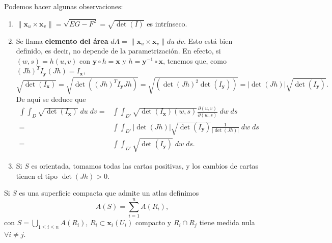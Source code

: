 \begin{observation} Podemos hacer algunas observaciones:
\begin{enumerate}
\item $\displaystyle \| \textbf{x} _{u} \times \textbf{x} _{v}\| = \sqrt{EG-F^{2}}=\sqrt{\det\left(I\right)} $ es intrínseco. 
\item Se llama \textbf{elemento del área} $\displaystyle dA = \| \textbf{x} _{u} \times \textbf{x} _{v}\| du\; dv $. Esto está bien definido, es decir, no depende de la parametrización. En efecto, si $\displaystyle \left(w,s\right)=h\left(u,v\right) $ con $\displaystyle \textbf{y} \circ h = \textbf{x}  $ y $\displaystyle h = \textbf{y} ^{-1} \circ \textbf{x}  $, tenemos que, como $\displaystyle \left(Jh\right)^{T}I _{ \textbf{y} }\left(Jh\right)= I _{ \textbf{x} } $, 
\[
	\sqrt{\det\left(I_{ \textbf{x} }\right)} =  \sqrt{\det\left(\left(Jh\right)^{T}I_{ \textbf{y} }Jh\right)} = \sqrt{\left(\det\left(Jh\right)^{2}\det\left(I_{ \textbf{y} }\right)\right)} = \left|\det\left(Jh\right)\right|\sqrt{\det\left(I_{ \textbf{y} }\right)} .
\]
De aquí se deduce que 
\[
\begin{split}
	\int \int _{D}\sqrt{\det\left(I_{ \textbf{x} }\right)} \; du \; dv = & \int \int _{D'}\sqrt{\det\left(I _{ \textbf{x} }\right)\left(w,s\right)}\frac{\partial \left(u,v\right)}{\partial \left(w,s\right)} \; dw \;  d s \\
	= &  \int \int _{D'} \left|\det\left(Jh\right)\right| \sqrt{\det\left(I _{ \textbf{y} }\right)}\frac{1}{|\det\left(Jh\right)|} \; dw \; d s\\
	= & \int \int _{D'}\sqrt{\det\left(I_{ \textbf{y} }\right)} \; dw \; d s.
\end{split}
\]
\item Si $\displaystyle S $ es orientada, tomamos todas las cartas positivas, y los cambios de cartas tienen el tipo $\displaystyle \det\left(Jh\right)>0 $.
\end{enumerate}
\end{observation}
\begin{definition}
Si $\displaystyle S $ es una superficie compacta que admite un atlas definimos
	\[A\left(S\right)=\sum^{n}_{i = 1}A\left(R_{i}\right) ,\]
	con $\displaystyle S = \bigcup_{1 \leq i \leq n}A\left(R_{i}\right) $, $\displaystyle R_{i}\subset \textbf{x} _{i}\left(U_{i}\right) $ compacto y $\displaystyle R_{i} \cap R_{j} $ tiene medida nula $\displaystyle \forall i \neq j $.
\end{definition}
